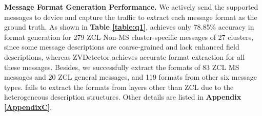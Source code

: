 \documentclass[10pt,journal,compsoc]{IEEEtran}
\begin{document}
\begin{table}[t]
    \setlength{\abovecaptionskip}{0pt}
    \setlength{\belowcaptionskip}{2pt}
    \caption{The comparison of the correctly generated message formats and discovered relationships. [C] represents the non-MS ZCL cluster messages, [M] represents MS ZCL messages and [G] represents the ZCL general messages. [B], [H], [O] represents basic, hidden and cross-device correlations.}
    \begin{center}
    \end{center}
    \label{table:q1}
    \vspace{-0.4cm}
\end{table}

\textbf{Message Format Generation Performance.} We actively send the supported messages to device and capture the traffic to extract each message format as the ground truth. As shown in \textbf{Table \textbf{\ref{table:q1}}}, \textbf{{\color{Orange}{B1}}} achieves only 78.85\% accuracy in format generation for 279 ZCL Non-MS cluster-specific messages of 27 clusters, since some message descriptions are coarse-grained and lack enhanced field descriptions, whereas ZVDetector achieves accurate format extraction for all these messages. Besides, we successfully extract the formats of 83 ZCL MS messages and 20 ZCL general messages, and 119 formats from other six message types. \textbf{{\color{Orange}{B1}}} fails to extract the formats from layers other than ZCL due to the heterogeneous description structures. Other details are listed in \textbf{Appendix \ref{AppendixC}}. \vspace{0.1cm}
\end{document}
